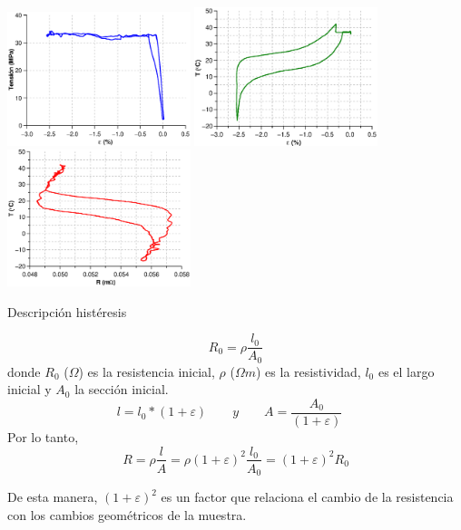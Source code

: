 \documentclass[usenames,dvipsnames]{beamer}
\begin{document}
\begin{frame}
        \includegraphics[width=0.4\textwidth]{img/resistencia/EjTensionDef.eps}
        \includegraphics[width=0.4\textwidth]{img/resistencia/EjTempDef.eps}
\newline
        \includegraphics[width=0.4\textwidth]{img/resistencia/EjTempRes.eps}

Descripción histéresis 

\end{frame}


\begin{frame}
 \begin{equation}
 R_0= \rho \frac{l_0}{A_0}
\end{equation}
donde $R_0$ ($\Omega$) es la resistencia inicial, $\rho$ ($\Omega m$) es la resistividad, $l_0$ es el largo inicial y $A_0$ la sección inicial. 
%
\begin{equation*}
 l=l_0 * (1+ \varepsilon)
  \quad \quad y \quad \quad  
 A=\frac{A_0}{(1+ \varepsilon)} \quad 
\end{equation*}
Por lo tanto, 
\begin{equation}
R= \rho \frac{l}{A} = \rho (1+\varepsilon)^2 \frac{l_0}{A_0} = (1+\varepsilon)^2 R_0 %
\end{equation}

De esta manera, $(1+\varepsilon)^2$ es un factor que relaciona el cambio de la resistencia con los cambios geométricos de la muestra. 
\end{frame}
\end{document}
